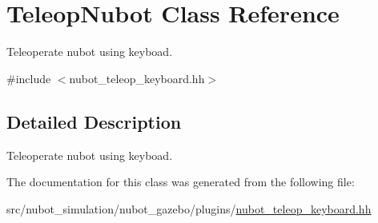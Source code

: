 \hypertarget{classTeleopNubot}{\section{Teleop\-Nubot Class Reference}
\label{classTeleopNubot}
}


Teleoperate nubot using keyboad.  




{\ttfamily \#include $<$nubot\-\_\-teleop\-\_\-keyboard.\-hh$>$}



\subsection{Detailed Description}
Teleoperate nubot using keyboad. 

The documentation for this class was generated from the following file\-:\begin{DoxyCompactItemize}
\item 
src/nubot\-\_\-simulation/nubot\-\_\-gazebo/plugins/\hyperlink{nubot__teleop__keyboard_8hh}{nubot\-\_\-teleop\-\_\-keyboard.\-hh}\end{DoxyCompactItemize}
